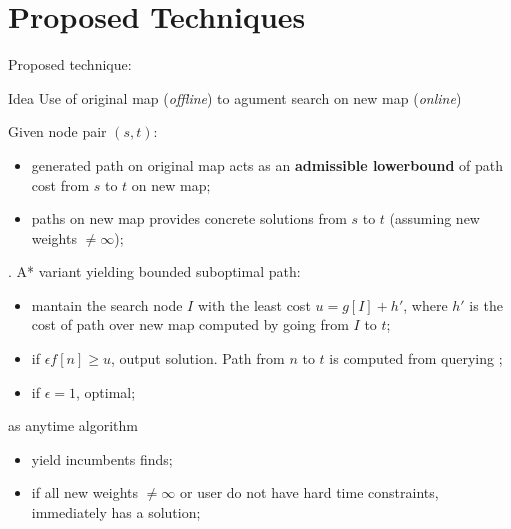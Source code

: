 \section*{Proposed Techniques}

\begin{frame}{Proposed technique: \CPDSearch{}}
    \begin{block}{Idea}
        Use \CPD{} of original map (\textit{offline}) to agument search on new map (\textit{online})
    \end{block}
    
    Given node pair $(s, t)$:
    \begin{itemize}
        \item \CPD{} generated path on original map acts as an \textbf{admissible lowerbound}
        of path cost from $s$ to $t$ on new map;
        \item \CPD{} paths on new map provides concrete solutions from $s$ to $t$ (assuming new weights $\not = \infty$);
    \end{itemize}

    \textbf{\CPDSearch{}}. A* variant yielding bounded suboptimal path:
    \begin{itemize}
        \item mantain the search node $I$ with the least cost $u = g[I] + h'$, where $h'$ is the cost of path over new map computed by \CPD{} going from $I$ to $t$;
        \item if $\epsilon f[n] \geq u$, output solution. Path from $n$ to $t$ is computed from querying \CPD{};
        \item if $\epsilon = 1$, \CPDSearch{} optimal;
    \end{itemize}
    
\end{frame}

\begin{frame}{\CPDSearch{} as anytime algorithm}
    \begin{itemize}
        \item yield incumbents \CPDSearch{} finds;
        \item if all new weights $\not = \infty$ or user do not have hard time constraints, \CPDSearch{} immediately has a solution;
    \end{itemize}
\end{frame}